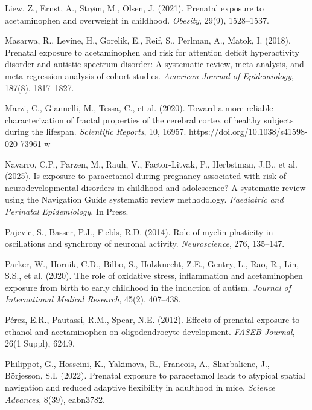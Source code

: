 \documentclass[12pt]{article}
\begin{document}
\begin{thebibliography}{99}
Liew, Z., Ernst, A., Strøm, M., Olsen, J. (2021).
Prenatal exposure to acetaminophen and overweight in childhood.
\textit{Obesity}, 29(9), 1528--1537.

Masarwa, R., Levine, H., Gorelik, E., Reif, S., Perlman, A., Matok, I. (2018).
Prenatal exposure to acetaminophen and risk for attention deficit hyperactivity disorder and autistic spectrum disorder: A systematic review, meta-analysis, and meta-regression analysis of cohort studies.
\textit{American Journal of Epidemiology}, 187(8), 1817--1827.

Marzi, C., Giannelli, M., Tessa, C., et al. (2020).
Toward a more reliable characterization of fractal properties of the cerebral cortex of healthy subjects during the lifespan.
\textit{Scientific Reports}, 10, 16957.
https://doi.org/10.1038/s41598-020-73961-w

Navarro, C.P., Parzen, M., Rauh, V., Factor-Litvak, P., Herbstman, J.B., et al. (2025).
Is exposure to paracetamol during pregnancy associated with risk of neurodevelopmental disorders in childhood and adolescence? A systematic review using the Navigation Guide systematic review methodology.
\textit{Paediatric and Perinatal Epidemiology}, In Press.

Pajevic, S., Basser, P.J., Fields, R.D. (2014).
Role of myelin plasticity in oscillations and synchrony of neuronal activity.
\textit{Neuroscience}, 276, 135--147.

Parker, W., Hornik, C.D., Bilbo, S., Holzknecht, Z.E., Gentry, L., Rao, R., Lin, S.S., et al. (2020).
The role of oxidative stress, inflammation and acetaminophen exposure from birth to early childhood in the induction of autism.
\textit{Journal of International Medical Research}, 45(2), 407--438.

Pérez, E.R., Pautassi, R.M., Spear, N.E. (2012).
Effects of prenatal exposure to ethanol and acetaminophen on oligodendrocyte development.
\textit{FASEB Journal}, 26(1 Suppl), 624.9.

Philippot, G., Hosseini, K., Yakimova, R., Francois, A., Skarbaliene, J., Börjesson, S.I. (2022).
Prenatal exposure to paracetamol leads to atypical spatial navigation and reduced adaptive flexibility in adulthood in mice.
\textit{Science Advances}, 8(39), eabn3782.


\end{thebibliography}
\end{document}
